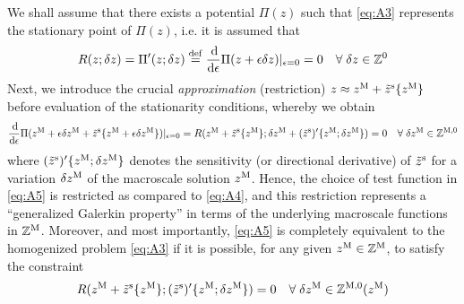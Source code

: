 \documentclass[12pt,a4paper]{article}
\begin{document}
We shall assume that there exists a potential $\Pi(z)$ such that \eqref{eq:A3} represents the stationary point of $\Pi(z)$, i.e. it is assumed that
\begin{align}
\label{eq:A4} R(z;\delta z) = \Pi'(z;\delta z) \overset{\mathrm{def}}{=} \frac{\operatorname{d \!}}{\operatorname{d \!}\epsilon}\Pi(z+\epsilon\delta z)|_{\epsilon = 0} = 0\quad \forall\;\delta z \in \mathbb{Z}^0
\end{align}
Next, we introduce the crucial \emph{approximation} (restriction) $z \approx z^{\mathrm{M}} + \tilde{z}^{\mathrm{s}}\{z^{\mathrm{M}}\}$ before evaluation of the stationarity conditions, whereby we obtain
\begin{align}
\label{eq:A5} \frac{\operatorname{d \!}}{\operatorname{d \!}\epsilon}\Pi(z^{\mathrm{M}}+\epsilon \delta z^{\mathrm{M}}+\tilde{z}^{\mathrm{s}}\{z^{\mathrm{M}}+\epsilon \delta z^{\mathrm{M}}\})|_{\epsilon = 0} =
R(z^{\mathrm{M}} + \tilde{z}^{\mathrm{s}}\{z^{\mathrm{M}}\}; \delta z^{\mathrm{M}} + (\tilde{z}^{\mathrm{s}})'\{z^{\mathrm{M}};\delta z^{\mathrm{M}}\}) = 0\quad \forall\;\delta z^{\mathrm{M}}\in\mathbb{Z}^{\mathrm{M},0}
\end{align}
where $(\tilde{z}^{\mathrm{s}})'\{z^{\mathrm{M}};\delta z^{\mathrm{M}}\}$ denotes the sensitivity (or directional derivative) of $\tilde z^{\mathrm{s}}$ for a variation $\delta z^{\mathrm{M}}$ of the macroscale solution $z^{\mathrm{M}}$.
Hence, the choice of test function in \eqref{eq:A5} is restricted as compared to \eqref{eq:A4}, and this restriction represents a ``generalized Galerkin property'' in terms of the underlying macroscale functions in $\mathbb{Z}^{\mathrm{M}}$.
Moreover, and most importantly, \eqref{eq:A5} is completely equivalent to the homogenized problem \eqref{eq:A3} if it is possible, for any given $z^{\mathrm{M}}\in\mathbb{Z}^{\mathrm{M}}$, to satisfy the constraint
\begin{align}
\label{eq:A6a} R(z^{\mathrm{M}} + \tilde z^{\mathrm{s}}\{z^{\mathrm{M}}\}; (\tilde{z}^{\mathrm{s}})'\{z^{\mathrm{M}};\delta z^{\mathrm{M}}\}) = 0\quad \forall\;\delta z^{\mathrm{M}}\in\mathbb{Z}^{\mathrm{M},0}(z^{\mathrm{M}})
\end{align}
\end{document}
